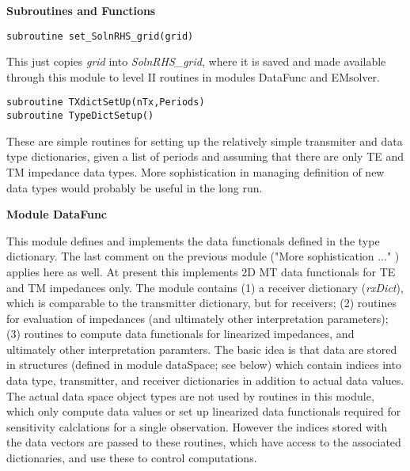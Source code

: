 \documentclass[12pt]{article}
\begin{document}
\vspace{10pt}

\noindent
{\bf Subroutines and Functions}

\vspace{6pt}

\begin{verbatim}
subroutine set_SolnRHS_grid(grid)
\end{verbatim}

This just copies {\it grid} into {\it SolnRHS\_grid}, where it is
saved and made available through this module to level II routines in
modules DataFunc and EMsolver.

\begin{verbatim}
subroutine TXdictSetUp(nTx,Periods)
subroutine TypeDictSetup()
\end{verbatim}

These are simple routines for setting up the relatively
simple transmiter and data type dictionaries, given a
list of periods and assuming that there are only TE
and TM impedance data types.  More sophistication
in managing definition of new data types would probably
be useful in the long run.

\vspace{10pt}

\noindent
{\bf Module DataFunc}

This module defines and implements the data functionals 
defined in the type dictionary.  The last comment on the previous
module ("More sophistication ..." ) applies here as well.
At present this implements  2D MT data functionals for TE 
and TM impedances only.  The module contains
(1) a receiver dictionary ({\it rxDict}), which is comparable to
the transmitter dictionary, but for receivers;
(2) routines for evaluation of impedances (and ultimately other
interpretation parameters);
(3) routines to compute data functionals for linearized
impedances,  and ultimately other interpretation paramters.
The basic idea is that data are stored in structures 
(defined in module dataSpace; see below) which contain 
indices into data type, transmitter, and receiver dictionaries
in addition to actual data values.  The actual data space
object types are not used by routines in this module,
which only compute data values or set up linearized data
functionals required for sensitivity calclations
for a single observation. However the indices stored with
the data vectors are passed to these routines,
which have access to the associated dictionaries,
and use these to control computations.
\end{document}
